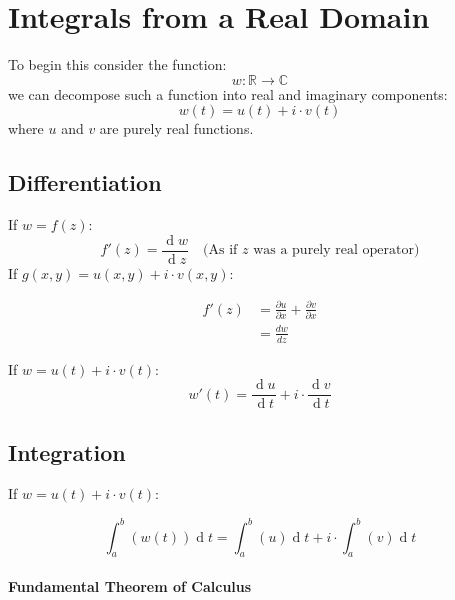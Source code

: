 \documentclass[class=article, crop=false]{standalone}
\author{}
\date{}
\begin{document}
\hypertarget{integrals-from-a-real-domain}{%
\section{Integrals from a Real
Domain}\label{integrals-from-a-real-domain}}

To begin this consider the function: \[
w: \mathbb{R}     \rightarrow \mathbb{C}
\] we can decompose such a function into real and imaginary components:
\[
w \left( t \right) =  u \left( t \right) +  i \cdot  v \left( t \right)
\] where \(u\) and \(v\) are purely real functions.

\hypertarget{differentiation}{%
\subsection{Differentiation}\label{differentiation}}

If \(w = f \left( z \right)\): \[
f' \left( z \right) = \frac{\operatorname{d}w }{\operatorname{d} z} \quad \text{(As if $z$ was a purely real operator)}
\] If
\(g\left( x,y \right) = u\left( x,y \right) + i \cdot v \left( x, y \right)\):

\[
\begin{aligned}
        f'\left( z \right) &= \frac{\partial u }{\partial x}+ \frac{\partial v }{\partial x} \\
        &= \frac{dw}{dz}
        \end{aligned}
        \]

If \(w = u\left( t \right) + i \cdot v \left( t \right)\): \[
w'\left( t \right) =  \frac{\operatorname{d}u }{\operatorname{d} t} + i \cdot \frac{\operatorname{d} v}{\operatorname{d} t}
\]

\hypertarget{integration}{%
\subsection{Integration}\label{integration}}

If \(w = u\left( t \right) + i \cdot v \left( t \right)\):

\[
\int^{b}_{a}\left( w \left( t \right)  \right) \operatorname{d}t =  \int^{b}_{a}\left( u \right) \operatorname{d}t + i \cdot  \int^{ b}_{a}\left( v \right) \operatorname{d}t
\]

\hypertarget{fundamental-theorem-of-calculus}{%
\paragraph{Fundamental Theorem of
Calculus}\label{fundamental-theorem-of-calculus}}
\end{document}
